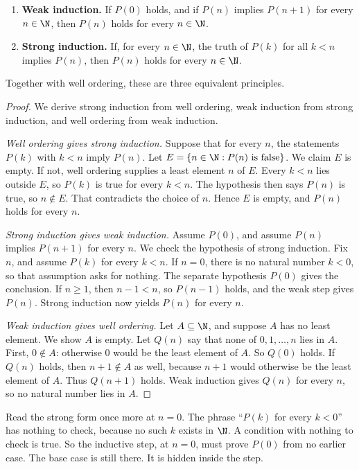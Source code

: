\begin{proposition}\label{prop:induction}
\begin{enumerate}[label=(\roman*)]
\item \textbf{Weak induction.} If $P(0)$ holds, and if $P(n)$ implies $P(n+1)$ for every $n\in\N$, then $P(n)$ holds for every $n\in\N$.
\item \textbf{Strong induction.} If, for every $n\in\N$, the truth of $P(k)$ for all $k<n$ implies $P(n)$, then $P(n)$ holds for every $n\in\N$.
\end{enumerate}
Together with well ordering, these are three equivalent principles.
\end{proposition}
\begin{proof}
We derive strong induction from well ordering, weak induction from strong induction, and well ordering from weak induction.

\emph{Well ordering gives strong induction.} Suppose that for every $n$, the statements $P(k)$ with $k<n$ imply $P(n)$. Let $E=\{n\in\N:P(n)\text{ is false}\}$. We claim $E$ is empty. If not, well ordering supplies a least element $n$ of $E$. Every $k<n$ lies outside $E$, so $P(k)$ is true for every $k<n$. The hypothesis then says $P(n)$ is true, so $n\notin E$. That contradicts the choice of $n$. Hence $E$ is empty, and $P(n)$ holds for every $n$.

\emph{Strong induction gives weak induction.} Assume $P(0)$, and assume $P(n)$ implies $P(n+1)$ for every $n$. We check the hypothesis of strong induction. Fix $n$, and assume $P(k)$ for every $k<n$. If $n=0$, there is no natural number $k<0$, so that assumption asks for nothing. The separate hypothesis $P(0)$ gives the conclusion. If $n\ge1$, then $n-1<n$, so $P(n-1)$ holds, and the weak step gives $P(n)$. Strong induction now yields $P(n)$ for every $n$.

\emph{Weak induction gives well ordering.} Let $A\subseteq\N$, and suppose $A$ has no least element. We show $A$ is empty. Let $Q(n)$ say that none of $0,1,\dots,n$ lies in $A$. First, $0\notin A$: otherwise $0$ would be the least element of $A$. So $Q(0)$ holds. If $Q(n)$ holds, then $n+1\notin A$ as well, because $n+1$ would otherwise be the least element of $A$. Thus $Q(n+1)$ holds. Weak induction gives $Q(n)$ for every $n$, so no natural number lies in $A$.
\end{proof}

Read the strong form once more at $n=0$. The phrase ``$P(k)$ for every $k<0$'' has nothing to check, because no such $k$ exists in $\N$. A condition with nothing to check is true. So the inductive step, at $n=0$, must prove $P(0)$ from no earlier case. The base case is still there. It is hidden inside the step.

